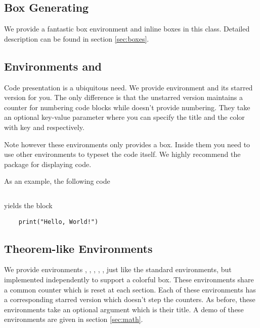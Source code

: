 \documentclass[showbib, lang=en]{DeanReport}
\begin{document}
\subsection{Box Generating}
We provide a fantastic box environment and inline boxes in this class. Detailed description can be found in section \ref{sec:boxes}.

\subsection{Environments  and }
Code presentation is a ubiquitous need. We provide environment  and its starred version  for you. The only difference is that the unstarred version maintains a counter for numbering code blocks while  doesn't provide numbering.
They take an optional key-value parameter where you can specify the title and the color with key  and  respectively.
\par 
Note however these environments only provides a box. Inside them you need to use other environments to typeset the code itself. We highly recommend the  package for displaying code.
\par 
As an example, the following code 
\begin{codeblock*}
\inputminted[autogobble]{latex}{examplecode}
\end{codeblock*}
yields the block
\begin{codeblock}[title = Hello World in Python, color = pink]
\begin{verbatim}
    print("Hello, World!")
\end{verbatim}
\end{codeblock}

\subsection{Theorem-like Environments}
We provide environments , , , , ,  just like the standard  environments, but implemented independently to support a colorful box. These environments share a common counter which is reset at each section. Each of these environments has a corresponding starred version which doesn't step the counters. As before, these environments take an optional argument which is their title. A demo of these environments are given in section \ref{sec:math}.
\end{document}

